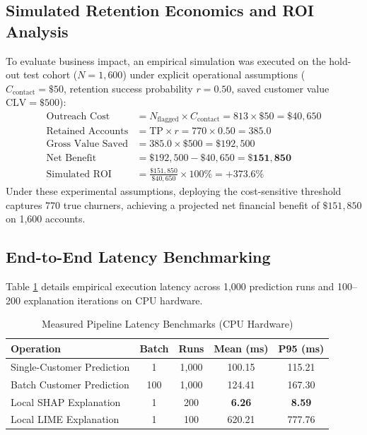 \documentclass[conference]{IEEEtran}
\begin{document}
\subsection{Simulated Retention Economics and ROI Analysis}
To evaluate business impact, an empirical simulation was executed on the hold-out test cohort ($N = 1,600$) under explicit operational assumptions ($C_{\text{contact}} = \$50$, retention success probability $r = 0.50$, saved customer value $\text{CLV} = \$500$):
\begin{align}
    \text{Outreach Cost} &= N_{\text{flagged}} \times C_{\text{contact}} = 813 \times \$50 = \$40,650 \\
    \text{Retained Accounts} &= \text{TP} \times r = 770 \times 0.50 = 385.0 \\
    \text{Gross Value Saved} &= 385.0 \times \$500 = \$192,500 \\
    \text{Net Benefit} &= \$192,500 - \$40,650 = \mathbf{\$151,850} \\
    \text{Simulated ROI} &= \frac{\$151,850}{\$40,650} \times 100\% = \mathbf{+373.6\%}
\end{align}
Under these experimental assumptions, deploying the cost-sensitive threshold captures 770 true churners, achieving a projected net financial benefit of $\$151,850$ on 1,600 accounts.

\subsection{End-to-End Latency Benchmarking}
Table \ref{tab:latency} details empirical execution latency across 1,000 prediction runs and 100--200 explanation iterations on CPU hardware.

\begin{table}[htbp]
\centering
\caption{Measured Pipeline Latency Benchmarks (CPU Hardware)}
\label{tab:latency}
\begin{tabular}{lcccc}
\toprule
\textbf{Operation} & \textbf{Batch} & \textbf{Runs} & \textbf{Mean (ms)} & \textbf{P95 (ms)} \\
\midrule
Single-Customer Prediction & 1 & 1,000 & 100.15 & 115.21 \\
Batch Customer Prediction & 100 & 1,000 & 124.41 & 167.30 \\
Local SHAP Explanation & 1 & 200 & \textbf{6.26} & \textbf{8.59} \\
Local LIME Explanation & 1 & 100 & 620.21 & 777.76 \\
\bottomrule
\end{tabular}
\end{table}
\end{document}
